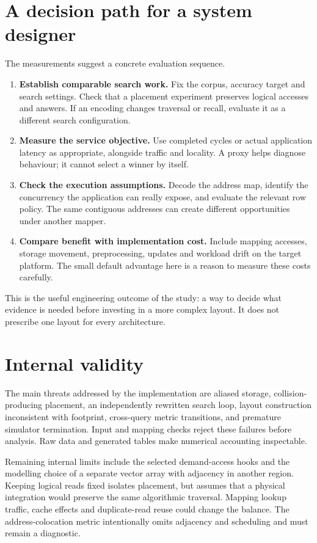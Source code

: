 \documentclass[11pt,a4paper]{report}
\begin{document}
\section{A decision path for a system designer}
The measurements suggest a concrete evaluation sequence.
\begin{enumerate}
\item \textbf{Establish comparable search work.} Fix the corpus, accuracy target and search settings. Check that a placement experiment preserves logical accesses and answers. If an encoding changes traversal or recall, evaluate it as a different search configuration.
\item \textbf{Measure the service objective.} Use completed cycles or actual application latency as appropriate, alongside traffic and locality. A proxy helps diagnose behaviour; it cannot select a winner by itself.
\item \textbf{Check the execution assumptions.} Decode the address map, identify the concurrency the application can really expose, and evaluate the relevant row policy. The same contiguous addresses can create different opportunities under another mapper.
\item \textbf{Compare benefit with implementation cost.} Include mapping accesses, storage movement, preprocessing, updates and workload drift on the target platform. The small default advantage here is a reason to measure these costs carefully.
\end{enumerate}
This is the useful engineering outcome of the study: a way to decide what evidence is needed before investing in a more complex layout. It does not prescribe one layout for every architecture.

\section{Internal validity}
The main threats addressed by the implementation are aliased storage, collision-producing placement, an independently rewritten search loop, layout construction inconsistent with footprint, cross-query metric transitions, and premature simulator termination. Input and mapping checks reject these failures before analysis. Raw data and generated tables make numerical accounting inspectable.

Remaining internal limits include the selected demand-access hooks and the modelling choice of a separate vector array with adjacency in another region. Keeping logical reads fixed isolates placement, but assumes that a physical integration would preserve the same algorithmic traversal. Mapping lookup traffic, cache effects and duplicate-read reuse could change the balance. The address-colocation metric intentionally omits adjacency and scheduling and must remain a diagnostic.
\end{document}
